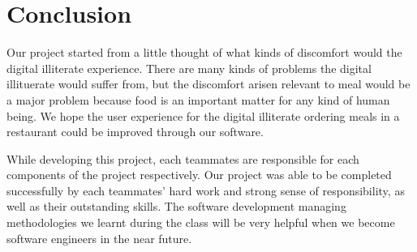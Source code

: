 \documentclass[conference,compsoc]{IEEEtran}
\begin{document}
\section{Conclusion}
Our project started from a little thought of what kinds of discomfort would the digital illiterate experience. There are many kinds of problems the digital illituerate would suffer from, but the discomfort arisen relevant to meal would be a major problem because food is an important matter for any kind of human being. We hope the user experience for the digital illiterate ordering meals in a restaurant could be improved through our software.

While developing this project, each teammates are responsible for each components of the project respectively. Our project was able to be completed successfully by each teammates' hard work and strong sense of responsibility, as well as their outstanding skills. The software development managing methodologies we learnt during the class will be very helpful when we become software engineers in the near future.

%
%

\end{document}
